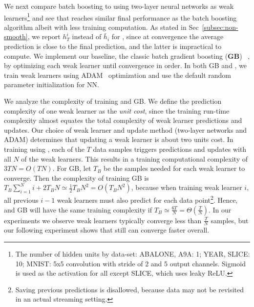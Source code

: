 
We next compare batch boosting to \algshort using two-layer neural networks as weak learners\footnote{The number of hidden units by data-set: ABALONE, A9A: 1; YEAR, SLICE: 10; MNIST: 5x5 convolution with stride of 2 and 5 output channels. Sigmoid is used as the activation for all except SLICE, which uses leaky ReLU. } and see that \algshort reaches  similar final performance as the batch boosting algorithm albeit with less training computation. 
As stated in Sec~\ref{subsec:non-smooth}, we report $h_T^i$ instead of $\bar{h}_i$ for \algshort, since at convergence the average prediction is close to the final prediction, and the latter is impractical to compute.  
We implement our baseline, the classic batch gradient boosting (\textbf{GB}) ~\citep{friedman2001greedy}, by optimizing each weak learner until convergence in order.
In both GB and \algshort, we train weak learners using ADAM~\citep{kingma2014adam} optimization and use the default random parameter initialization for NN.

We analyze the complexity of training \algshort and GB. We define the prediction complexity of one weak learner as the \textit{unit 
cost}, since the training run-time complexity almost equates the total complexity of weak learner predictions and updates. Our choice of weak learner and update method (two-layer networks and ADAM) determines that updating a weak learner is about two units cost. 
In training using \algshort, each of the $T$ data samples triggers predictions and updates with all $N$ of the weak learners. This results in a training computational complexity of $3TN = O(TN)$. For GB, let $T_B$ be the samples needed for each weak learner to converge. Then the complexity of training GB is $T_B \sum _{i=1}^N i +  2T_B N \simeq \frac{1}{2}T_BN^2= O(T_B N^2)$, because when training weak learner $i$, all previous $i-1$ weak learners must also predict for each data point\footnote{Saving previous predictions is disallowed, because data may not be revisited in an actual streaming setting.}. 
Hence, \algshort and GB will have the same training complexity if $T_B \simeq \frac{6T}{N} = \Theta(\frac{T}{N})$. In our experiments we observe weak learners typically converge less than $\frac{T}{N}$ samples, but our following experiment shows that \algshort still can converge faster overall.  

